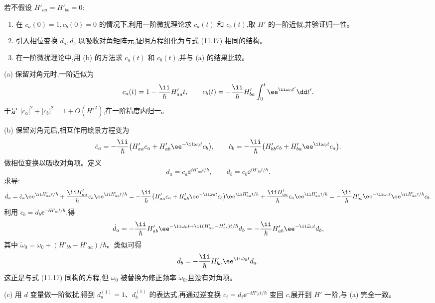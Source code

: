 \begin{question}
若不假设 $H'_{aa}=H'_{bb}=0$:
\begin{enumerate}
\item 在 $c_a(0)=1,c_b(0)=0$ 的情况下,利用一阶微扰理论求 $c_a(t)$ 和 $c_b(t)$,取 $H'$ 的一阶近似,并验证归一性。
\item 引入相位变换 $d_a,d_b$ 以吸收对角矩阵元,证明方程组化为与式 (11.17) 相同的结构。
\item 在一阶微扰理论中,用 (b) 的方法求 $c_a(t)$ 和 $c_b(t)$,并与 (a) 的结果比较。
\end{enumerate}

\par\smallskip
{}

\end{question}
\begin{solution}
(a) 保留对角元时,一阶近似为
\[
c_a(t)=1-{\ii\over\hbar}H'_{aa}t,
\qquad
c_b(t)=-{\ii\over\hbar}H'_{ba}\int_0^t \ee^{\ii\omega_0t'}\dd t'.
\]
于是 $|c_a|^2+|c_b|^2=1+O(H'^2)$,在一阶精度内归一。

(b) 保留对角元后,相互作用绘景方程变为
\[
\dot c_a=-{\ii\over\hbar}\big(H'_{aa}c_a+H'_{ab}\ee^{-\ii\omega_0t}c_b\big),\qquad
\dot c_b=-{\ii\over\hbar}\big(H'_{bb}c_b+H'_{ba}\ee^{\ii\omega_0t}c_a\big).
\]
做相位变换以吸收对角项。定义
\[
d_a=c_a \ee^{\ii H'_{aa}t/\hbar},\qquad
d_b=c_b \ee^{\ii H'_{bb}t/\hbar}.
\]
求导:
\[
\dot d_a=\dot c_a \ee^{\ii H'_{aa}t/\hbar}+{\ii H'_{aa}\over\hbar}c_a \ee^{\ii H'_{aa}t/\hbar}
=-{\ii\over\hbar}\big(H'_{aa}c_a+H'_{ab}\ee^{-\ii\omega_0t}c_b\big)\ee^{\ii H'_{aa}t/\hbar}
+{\ii H'_{aa}\over\hbar}c_a \ee^{\ii H'_{aa}t/\hbar}
=-{\ii\over\hbar}H'_{ab}\ee^{-\ii\omega_0t}\ee^{\ii H'_{aa}t/\hbar}c_b.
\]
利用 $c_b=d_b \ee^{-\ii H'_{bb}t/\hbar}$,得
\[
\dot d_a=-{\ii\over\hbar}H'_{ab}\ee^{-\ii\omega_0t+\ii(H'_{aa}-H'_{bb})t/\hbar}d_b
=-{\ii\over\hbar}H'_{ab}\ee^{-\ii\tilde\omega_0 t}d_b,
\]
其中 $\tilde\omega_0=\omega_0+(H'_{bb}-H'_{aa})/\hbar$。类似可得
\[
\dot d_b=-{\ii\over\hbar}H'_{ba}\ee^{\ii\tilde\omega_0 t}d_a.
\]
这正是与式 (11.17) 同构的方程,但 $\omega_0$ 被替换为修正频率 $\tilde\omega_0$,且没有对角项。

(c) 用 $d$ 变量做一阶微扰,得到 $d_a^{(1)}=1$、$d_b^{(1)}$ 的表达式,再通过逆变换 $c_i=d_i \ee^{-\ii H'_{\ii i}t/\hbar}$ 变回 $c$,展开到 $H'$ 一阶,与 (a) 完全一致。
\end{solution}

